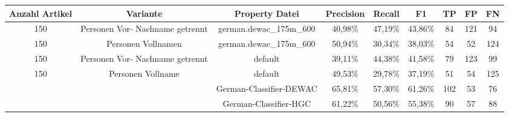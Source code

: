 \documentclass[a4paper]{article}
\begin{document}
\begin{sidewaystable}
\label{Tabelle Ergebnisse}
\caption{Ergebnistabelle}
\begin{longtable}{|c|c|c|c|c|c|c|c|c|}
\hline 
Anzahl Artikel & Variante & Property Datei & Precision & Recall & F1 & TP & FP & FN \\ 
\hline 
150 & Personen Vor- Nachname getrennt & german.dewac\_175m\_600 & 40,98\% & 47,19\% & 43,86\% & 84 & 121 & 94 \\ 
\hline 
150 & Personen Vollnamen & german.dewac\_175m\_600 & 50,94\% & 30,34\% & 38,03\% & 54 & 52 & 124 \\ 
\hline 
150 & Personen Vor- Nachname getrennt & default & 39,11\% & 44,38\% & 41,58\% &  79 & 123 & 99 \\ 
\hline 
150 & Personen Vollname & default & 49,53\% & 29,78\% & 37,19\% & 51 & 54 & 125 \\ 
\hline 
  &  & German-Classifier-DEWAC & 65,81\% & 57,30\% & 61,26\% & 102 & 53 & 76 \\ 
\hline 
  &  & German-Classifier-HGC & 61,22\% & 50,56\% & 55,38\% & 90 & 57 & 88 \\ 
\hline
\end{longtable} 
\end{sidewaystable}
\end{document}
